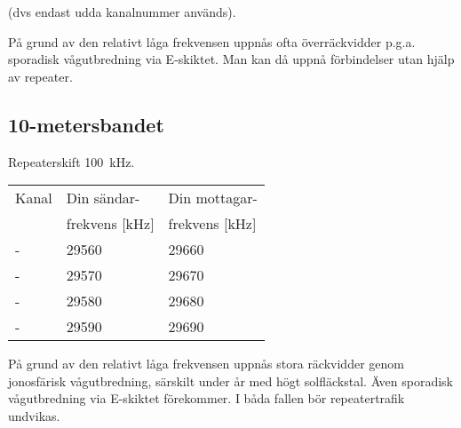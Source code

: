 (dvs endast udda kanalnummer används).

På grund av den relativt låga frekvensen uppnås ofta överräckvidder p.g.a.
sporadisk vågutbredning via E-skiktet.
Man kan då uppnå förbindelser utan hjälp av repeater.

\subsection{10-metersbandet}
Repeaterskift 100~kHz.

\begin{tabular}{ l | l | l }
  Kanal & Din sändar- & Din mottagar- \\
        & frekvens [kHz] & frekvens [kHz] \\
  \hline
  - & 29560 & 29660 \\
  - & 29570 & 29670 \\
  - & 29580 & 29680 \\
  - & 29590 & 29690 \\
\end{tabular}

På grund av den relativt låga frekvensen uppnås stora räckvidder genom
jonosfärisk vågutbredning, särskilt under år med högt solfläckstal.
Även sporadisk vågutbredning via E-skiktet förekommer.
I båda fallen bör repeatertrafik undvikas.

